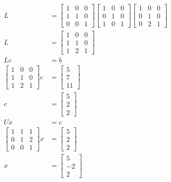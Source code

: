 \documentclass[main.tex]{subfiles}
\begin{document}
\begin{enumerate}
$$\begin{aligned}
    L &=\left[\begin{array}{lll}
    1 & 0 & 0 \\
    1 & 1 & 0 \\
    0 & 0 & 1
    \end{array}\right]\left[\begin{array}{lll}
    1 & 0 & 0 \\
    0 & 1 & 0 \\
    1 & 0 & 1
    \end{array}\right]\left[\begin{array}{lll}
    1 & 0 & 0 \\
    0 & 1 & 0 \\
    0 & 2 & 1
    \end{array}\right] \\
    L &= \left[\begin{array}{lll}
    1 & 0 & 0 \\
    1 & 1 & 0 \\
    1 & 2 & 1
    \end{array}\right]\\
    L c &= b \\
    \left[\begin{array}{lll}
    1 & 0 & 0 \\
    1 & 1 & 0 \\
    1 & 2 & 1
    \end{array}\right] c &= \left[\begin{array}{l}
    5 \\
    7 \\
    11
    \end{array}\right]\\
    c&=\left[\begin{array}{l}
    5 \\
    2 \\
    2
    \end{array}\right]\\
    U x &= c \\
    \left[\begin{array}{lll}
    1 & 1 & 1 \\
    0 & 1 & 2 \\
    0 & 0 & 1
    \end{array}\right] x &= \left[\begin{array}{l}
    5 \\
    2 \\
    2
    \end{array}\right]\\
    x &= \left[\begin{array}{l}
    5 \\
    -2 \\
    2
    \end{array}\right]
    \end{aligned}
    $$
    

\end{enumerate}
\end{document}
